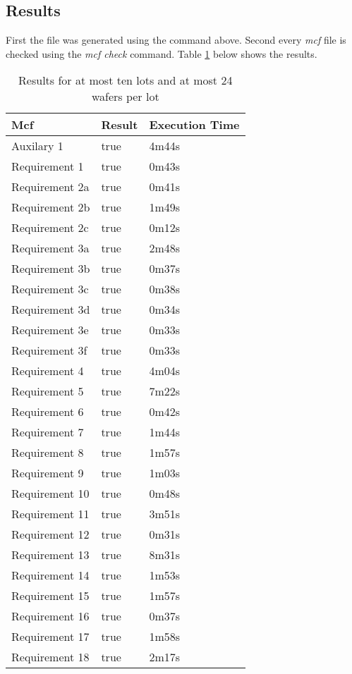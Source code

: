 \subsection{Results}
First the  file was generated using the  command above. Second every \textit{mcf} file is checked using the \textit{mcf check} command.
Table \ref{tab:results1024} below shows the results.
\begin{table}[!hb]
    \centering
    \begin{tabular}{|l|l|l|}
        \hline
        \textbf{Mcf} & \textbf{Result} & \textbf{Execution Time} \\ \hline
			Auxilary 1 & true & 4m44s \\ \hline
			Requirement 1 & true & 0m43s \\ \hline
			Requirement 2a & true & 0m41s \\ \hline
			Requirement 2b & true & 1m49s \\ \hline
			Requirement 2c & true & 0m12s \\ \hline
			Requirement 3a & true & 2m48s \\ \hline
			Requirement 3b & true & 0m37s \\ \hline
			Requirement 3c & true & 0m38s \\ \hline
			Requirement 3d & true & 0m34s \\ \hline
			Requirement 3e & true & 0m33s \\ \hline
			Requirement 3f & true & 0m33s \\ \hline
			Requirement 4 & true & 4m04s \\ \hline
			Requirement 5 & true & 7m22s \\ \hline
			Requirement 6 & true & 0m42s \\ \hline
			Requirement 7 & true & 1m44s \\ \hline
			Requirement 8 & true & 1m57s \\ \hline
			Requirement 9 & true & 1m03s \\ \hline
			Requirement 10 & true & 0m48s \\ \hline
			Requirement 11 & true & 3m51s \\ \hline
			Requirement 12 & true & 0m31s \\ \hline
			Requirement 13 & true & 8m31s \\ \hline
			Requirement 14 & true & 1m53s \\ \hline
			Requirement 15 & true & 1m57s \\ \hline
			Requirement 16 & true & 0m37s \\ \hline
			Requirement 17 & true & 1m58s \\ \hline
			Requirement 18 & true & 2m17s \\ \hline
    \end{tabular}
    \caption{Results for at most ten lots and at most 24 wafers per lot}
    \label{tab:results1024}
\end{table}

